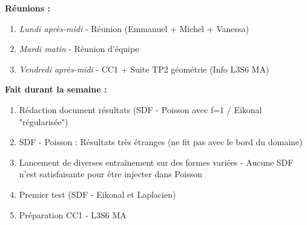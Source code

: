 \textbf{Réunions :}
\begin{enumerate}[label=\textbullet]
	\item \textit{Lundi après-midi} - Réunion (Emmanuel + Michel + Vanessa)
	\item \textit{Mardi matin} - Réunion d'équipe
	\item \textit{Vendredi après-midi} - CC1 + Suite TP2 géométrie (Info L3S6 MA)
\end{enumerate}
\textbf{Fait durant la semaine :}
\begin{enumerate}[label=\textbullet]
	\item Rédaction document résultats (SDF - Poisson avec f=1 / Eikonal "régularisée")
	\item SDF - Poisson : Résultats très étranges (ne fit pas avec le bord du domaine)
	\item Lancement de diverses entraînement sur des formes variées - Aucune SDF n'est satisfaisante pour être injecter dans Poisson
	\item Premier test (SDF - Eikonal et Laplacien)
	\item Préparation CC1 - L3S6 MA
\end{enumerate}